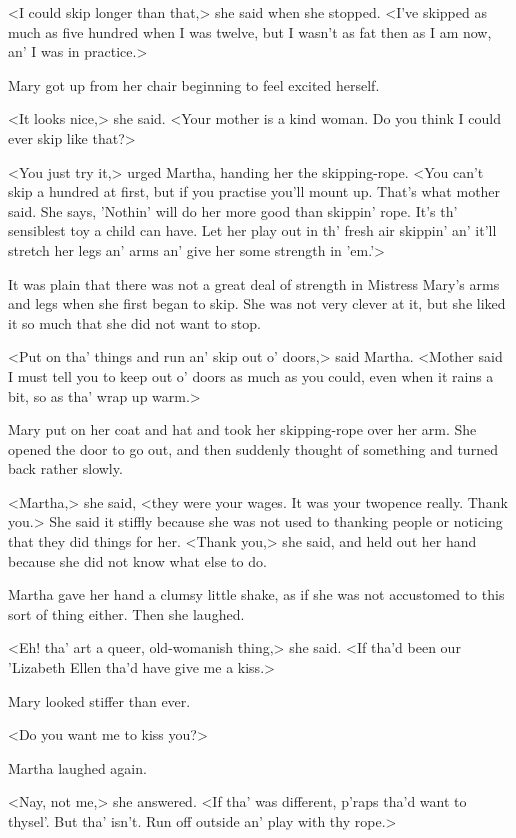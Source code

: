 <I could skip longer than that,> she said when she stopped. <I've skipped as much as five hundred when I was twelve, but I wasn't as fat then as I am now, an' I was in practice.>

Mary got up from her chair beginning to feel excited herself.

<It looks nice,> she said. <Your mother is a kind woman. Do you think I could ever skip like that?>

<You just try it,> urged Martha, handing her the skipping-rope. <You can't skip a hundred at first, but if you practise you'll mount up. That's what mother said. She says, 'Nothin' will do her more good than skippin' rope. It's th' sensiblest toy a child can have. Let her play out in th' fresh air skippin' an' it'll stretch her legs an' arms an' give her some strength in 'em.'>

It was plain that there was not a great deal of strength in Mistress Mary's arms and legs when she first began to skip. She was not very clever at it, but she liked it so much that she did not want to stop.

<Put on tha' things and run an' skip out o' doors,> said Martha. <Mother said I must tell you to keep out o' doors as much as you could, even when it rains a bit, so as tha' wrap up warm.>

Mary put on her coat and hat and took her skipping-rope over her arm. She opened the door to go out, and then suddenly thought of something and turned back rather slowly.

<Martha,> she said, <they were your wages. It was your twopence really. Thank you.> She said it stiffly because she was not used to thanking people or noticing that they did things for her. <Thank you,> she said, and held out her hand because she did not know what else to do.

Martha gave her hand a clumsy little shake, as if she was not accustomed to this sort of thing either. Then she laughed.

<Eh! tha' art a queer, old-womanish thing,> she said. <If tha'd been our 'Lizabeth Ellen tha'd have give me a kiss.>

Mary looked stiffer than ever.

<Do you want me to kiss you?>

Martha laughed again.

<Nay, not me,> she answered. <If tha' was different, p'raps tha'd want to thysel'. But tha' isn't. Run off outside an' play with thy rope.>

